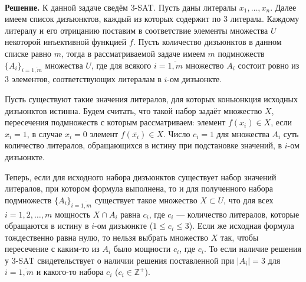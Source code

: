 \documentclass[10pt]{article}
\begin{document}
\ \\[0.2cm]
\textbf{Решение.} К данной задаче сведём 3-SAT. Пусть даны литералы $x_1, \dots, x_n$. Далее имеем список дизъюнктов, каждый из которых содержит по $3$ литерала. Каждому литералу и его отрицанию поставим в соответствие элементы множества $U$ некоторой инъективной функцией $f$. Пусть количество дизъюнктов в данном списке равно $m$, тогда в рассматриваемой задаче имеем $m$ подмножеств $\{A_i\}_{i=\overline{1,m}}$ множества $U$, где для всякого $i=\overline{1, m}$ множество $A_i$ состоит ровно из $3$ элементов, соответствующих литералам в $i$-ом дизъюнкте.
\medskip\par
Пусть существуют такие значения литералов, для которых коньюнкция исходных дизъюнктов истинна. Будем считать, что такой набор задаёт множество $X$, пересечения подмножеств с которым рассматриваем: элемент $f(x_i)\in X$, если $x_i=1$, в случае $x_i=0$ элемент $f(\overline{x_i})\in X$. Число $c_i=1$ для множества $A_i$ суть количество литералов, обращающихся в истину при подстановке значений, в $i$-ом дизъюнкте.
\medskip\par
Теперь, если для исходного набора дизъюнктов существует набор значений литералов, при котором формула выполнена, то и для полученного набора подмножеств $\{A_i\}_{i=\overline{1,m}}$ существует такое множество $X\subset U$, что для всех $i = 1, 2, \dots, m$ мощность $X \cap A_i$ равна $c_i$, где $c_i$ --- количество литералов, которые обращаются в истину в $i$-ом дизъюнкте ($1\leq c_i \leq 3$). Если же исходная формула тождественно равна нулю, то нельзя выбрать множество $X$ так, чтобы пересечение с каким-то из $A_i$ было мощности $c_i$, где $c_i$. То если наличие решения у 3-SAT свидетельствует о наличии решения поставленной при $|A_i|=3$ для $i=\overline{1, m}$ и какого-то набора $c_i$ ($c_i\in\mathbb{Z}^+$).
\end{document}
